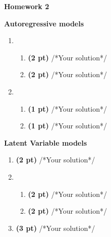 \documentclass{article}
\begin{document}
\begin{center}
    {\Large \textbf{Homework 2}} \\
\end{center}

{\large \textbf{Autoregressive models}}
\begin{enumerate}
    \item 
    \begin{enumerate}
    	\item  \textbf{(2 pt)} /*Your solution*/
    	\item  \textbf{(2 pt)} /*Your solution*/
    \end{enumerate}
    \item 
    	\begin{enumerate}
    		\item \textbf{(1 pt)} /*Your solution*/
    		\item \textbf{(1 pt)} /*Your solution*/
    	\end{enumerate}
\end{enumerate}

{\large \textbf{Latent Variable models}}
\begin{enumerate}
	\item \textbf{(2 pt)} /*Your solution*/
	\item 
	 \begin{enumerate}
		 \item \textbf{(2 pt)} /*Your solution*/
		 \item \textbf{(2 pt)} /*Your solution*/
	 \end{enumerate}
	  \item \textbf{(3 pt)} /*Your solution*/
\end{enumerate}
\end{document}
